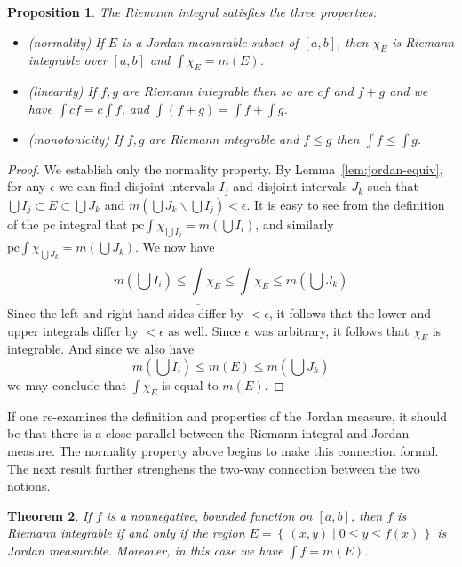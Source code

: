 \documentclass[11pt,oneside]{amsbook}
\newcommand{\set}[1]{\left\{\,#1\,\right\}}
\renewcommand{\setminus}{\smallsetminus}
\newcommand{\lint}{\underline\int}
\newcommand{\ovint}{\overline\int}
\theoremstyle{definition}
\theoremstyle{plain}
\newtheorem{thm}{Theorem}[section]
\newtheorem{prop}[thm]{Proposition}
\theoremstyle{definition}
\theoremstyle{remark}
\numberwithin{equation}{section}
\numberwithin{figure}{section}
\begin{document}
\begin{prop}
  The Riemann integral satisfies the three properties:
  \begin{itemize}
  \item (normality) If $E$ is a Jordan measurable subset of $[a,b]$, then $\chi_E$ is Riemann integrable over $[a,b]$ and $\int\chi_E=m(E)$.
  \item (linearity) If $f,g$ are Riemann integrable then so are $cf$ and $f+g$ and we have $\int cf=c\int f$, and $\int(f+g)=\int f+\int g$.
  \item (monotonicity) If $f,g$ are Riemann integrable and $f\leq g$ then $\int f\leq \int g$.
  \end{itemize}
\end{prop}

\begin{proof}
  We establish only the normality property. By Lemma~\ref{lem:jordan-equiv}, for any $\epsilon$ we can find disjoint intervals $I_j$ and disjoint intervals $J_k$ such that $\bigcup I_j\subset E\subset\bigcup J_k$ and $m(\bigcup J_k\setminus\bigcup I_j)<\epsilon$. It is easy to see from the definition of the pc integral that $\text{pc}\int\chi_{\bigcup I_j}=m(\bigcup I_i)$, and similarly $\text{pc}\int\chi_{\bigcup J_k}=m(\bigcup J_k)$. We now have
  \[m(\bigcup I_i)\leq\lint\chi_E\leq\ovint\chi_E
  \leq m(\bigcup J_k)
  \]
  Since the left and right-hand sides differ by $<\epsilon$, it follows that the lower and upper integrals differ by $<\epsilon$ as well. Since $\epsilon$ was arbitrary, it follows that $\chi_E$ is integrable. And since we also have
  \[m(\bigcup I_i)\leq m(E)\leq m(\bigcup J_k)
  \]
  we may conclude that $\int\chi_E$ is equal to $m(E)$.
\end{proof}

If one re-examines the definition and properties of the Jordan measure, it should be that there is a close parallel between the Riemann integral and Jordan measure. The normality property above begins to make this connection formal. The next result further strenghens the two-way connection between the two notions.

\begin{thm}
  If $f$ is a nonnegative, bounded function on $[a,b]$, then $f$ is Riemann integrable if and only if the region $E=\set{(x,y)\mid0\leq y\leq f(x)}$ is Jordan measurable. Moreover, in this case we have $\int f=m(E)$.
\end{thm}
\end{document}
